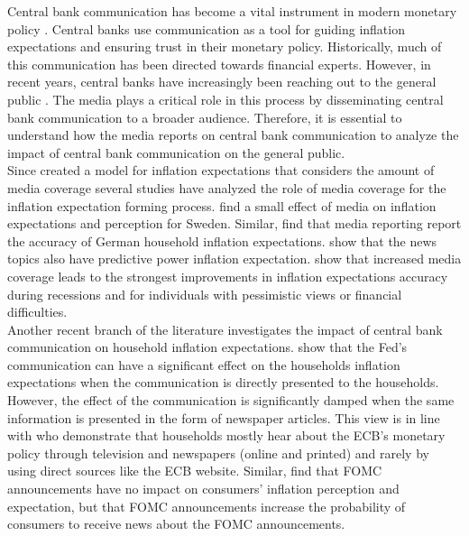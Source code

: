 \documentclass[review]{elsarticle}
\begin{document}
Central bank communication has become a vital instrument in modern monetary policy \citep{Blinderetal2017}. Central banks use communication as a tool for guiding inflation expectations and ensuring trust in their monetary policy. Historically, much of this communication has been directed towards financial experts. However, in recent years, central banks have increasingly been reaching out to the general public \citep{Blinderetal2022}. The media plays a critical role in this process by disseminating central bank communication to a broader audience. Therefore, it is essential to understand how the media reports on central bank communication to analyze the impact of central bank communication on the general public.
%
%
%
\\
Since \cite{Carroll2003} created a model for inflation expectations that considers the amount of media coverage several studies have analyzed the role of media coverage for the inflation expectation forming process. \cite{Draeger2015} find a small effect of media on inflation expectations and perception for Sweden. Similar, \cite{LamlaLein2014} find that media reporting report the accuracy of German household inflation expectations. \citep{Larsen2021} show that the news topics also have predictive power inflation expectation. \cite{Ehrmann2017} show that increased media coverage leads to the strongest improvements in inflation expectations accuracy during recessions and for individuals with pessimistic views or financial difficulties.  
%
%
\\
%
Another recent branch of the literature investigates the impact of central bank communication on household inflation expectations. \cite{Coibion2022} show that the Fed's communication can have a significant effect on the households inflation expectations when the communication is directly presented to the households. However, the effect of the communication is significantly damped when the same information is presented in the form of newspaper articles. This view is in line with \cite{Gardt2022} who demonstrate that households mostly hear about the ECB's monetary policy through television and newspapers (online and printed) and rarely by using direct sources like the ECB website. Similar, \cite{LamalaVinogradov2019} find that FOMC announcements have no impact on consumers' inflation perception and expectation, but that FOMC announcements increase the probability of consumers to receive news about the FOMC announcements. 
\end{document}
